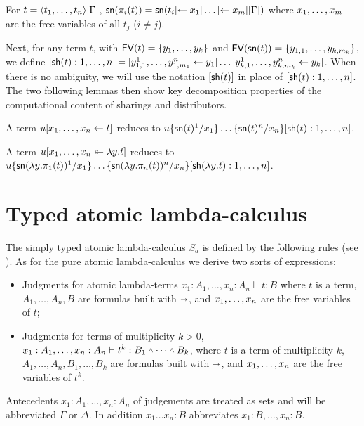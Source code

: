 \documentclass{llncs} %
\begin{document}
\begin{proposition}\label{prop:sn_pi}
For $t=\tup t\G$, $\sn(\pi_i(t))=\sn(t_i\share*{}{x_1}\dots\share*{}{x_m}\G)$ where
$\vv[m]x$ are the free variables of all $t_j$ ($i\neq j$).
\end{proposition}


Next, for any term $t$, with $\FV(t)=\{y_1,\dots,y_k\}$ and $\FV(\sn(t))=\{y_{1,1},\dots,y_{k,m_k}\}$, we define
$[\sh (t):1,\dots,n] =
\share*{y_{1,1}^1,\dots,y_{1,m_1}^n}{y_1}\dots
\share*{y_{k,1}^1,\dots,y_{k,m_k}^n}{y_k}$.
%
When there is no ambiguity, we will use the notation $[\sh (t)]$ in place of $[\sh (t):1,\dots,n]$.
%
The two following lemmas then show key decomposition properties of the computational content of sharings and distributors.


\begin{lemma}
\label{lem:unsharing}
A term $u\share xt$ reduces to $u\sub{x_1}{\sn(t)^1}\dots\sub{x_n}{\sn(t)^n}[\sh (t):1,\dots,n]$.
\end{lemma}

\begin{lemma}
\label{lem:undist}
A term $u\distr xyt$ reduces to
\\ $u\sub{x_1}{\sn(\lambda y.\pi_1(t))^1}\dots\sub{x_n}{\sn(\lambda y.\pi_n(t))^n}[\sh (\lambda y.t):1,\dots,n]$.
\end{lemma}




\section{Typed atomic lambda-calculus}\label{sec:types}


The simply typed atomic lambda-calculus $S_a$ is defined by the following rules (see \cite{Gundersen-Heijltjes-Parigot-2013-JFLA,Gundersen-Heijltjes-Parigot-2013-LICS}).
%
%
As for the pure atomic lambda-calculus we derive two sorts of expressions:
\begin{itemize}

 \item Judgments for atomic lambda-terms $x_1: A_1,\dots, x_n : A_n \vdash t : B$ where $t$ is a term, $A_1, \dots, A_n, B$ are formulas built with $\vlim$, and $\vv x$ are the free variables of $t$;

 \item Judgments for terms of multiplicity $k>0$, $x_1: A_1,\dots, x_n : A_n \vdash t^k : B_1 \vlan\cdots\vlan B_k$, where $t$ is a term of multiplicity $k$, $A_1, \dots, A_n, B_1, \dots, B_k$ are formulas built with $\vlim$, and $\vv x$ are the free variables of $t^k$.

\end{itemize}
Antecedents $x_1: A_1,\dots, x_n : A_n$ of judgements are treated as sets and will be abbreviated $\Gamma$ or $\Delta$. In addition $x_1\ldots x_n : B$ abbreviates $x_1\colon B,\ldots,x_n : B$.
%
\end{document}
